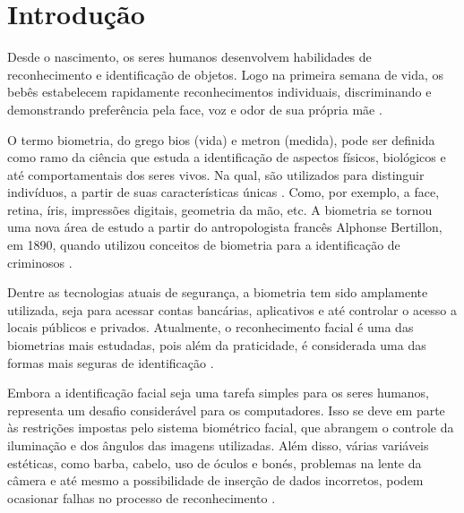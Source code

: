 
\chapter{Introdução}\label{cap:introducao}

Desde o nascimento, os seres humanos desenvolvem habilidades de reconhecimento 
e identificação de objetos. Logo na primeira semana de vida, os bebês estabelecem 
rapidamente reconhecimentos individuais, discriminando e demonstrando preferência 
pela face, voz e odor de sua própria mãe \cite{vieira2017}.

O termo biometria, do grego bios (vida) e metron (medida), pode ser 
definida como ramo da ciência que estuda a identificação de aspectos físicos, biológicos e até 
comportamentais dos seres vivos. Na qual, são utilizados para distinguir indivíduos, 
a partir de suas características únicas \cite{ferreira2009}. Como, por exemplo, a face, retina, 
íris, impressões digitais, geometria da mão, etc. A biometria se tornou uma nova área de estudo 
a partir do antropologista francês Alphonse Bertillon, em 1890, quando utilizou 
conceitos de biometria para a identificação de criminosos \cite{moraes2006}. 

Dentre as tecnologias atuais de segurança, a biometria tem sido amplamente 
utilizada, seja para acessar contas bancárias, aplicativos e até controlar 
o acesso a locais públicos e privados. Atualmente, o reconhecimento facial 
é uma das biometrias mais estudadas, pois além da praticidade, é considerada uma 
das formas mais seguras de identificação \cite{zhao2003}. 

Embora a identificação facial seja uma tarefa simples para os seres humanos, 
representa um desafio considerável para os computadores. Isso se deve em 
parte às restrições impostas pelo sistema biométrico facial, que abrangem 
o controle da iluminação e dos ângulos das imagens utilizadas. Além disso, 
várias variáveis estéticas, como barba, cabelo, uso de óculos e bonés, 
problemas na lente da câmera e até mesmo a possibilidade de inserção de 
dados incorretos, podem ocasionar falhas no processo de 
reconhecimento \cite{cavalcanti2005}.

